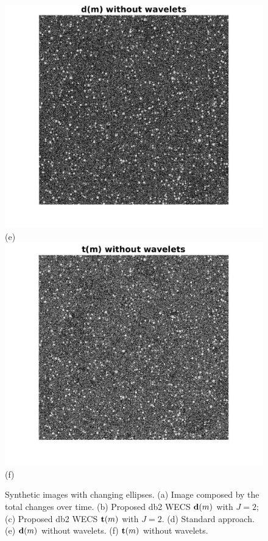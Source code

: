 \documentclass[journal]{IEEEtran}
\newcommand{\vd}{{\textbf d}}
\newcommand{\vt}{{\textbf t}}
\begin{document}
\begin{figure}[htp!]
\includegraphics[scale=.1]{../../figs/corr_changes_dm_nowavelets}(e)
\includegraphics[scale=.1]{../../figs/corr_changes_tm_nowavelets}(f)
\caption{Synthetic images with changing ellipses. (a) Image composed by the total changes over time. 
(b) Proposed db2 WECS $\vd(m)$ with $J=2$; (c) Proposed db2 WECS $\vt(m)$ with $J=2$.
(d) Standard approach. (e) $\vd(m)$ without wavelets. (f) $\vt(m)$  without wavelets. 
}
\label{F:Changes_methods_images}
\end{figure}
\end{document}
